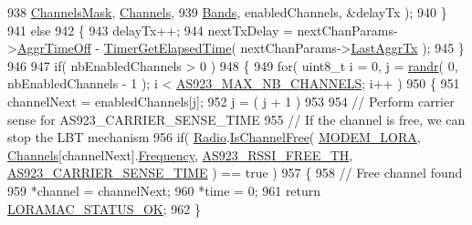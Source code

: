 \begin{DoxyCode}
938                                                       \mbox{\hyperlink{_region_a_s923_8c_a2188957b5ca6af8092154d7ccbfa5757}{ChannelsMask}}, 
      \mbox{\hyperlink{_region_a_s923_8c_a02bae2504563543865d6b0e81c48ab61}{Channels}},
939                                                       \mbox{\hyperlink{_region_a_s923_8c_a0b72a92a2d2766ee7cbc3ae162996cbf}{Bands}}, enabledChannels, &delayTx );
940     \}
941     \textcolor{keywordflow}{else}
942     \{
943         delayTx++;
944         nextTxDelay = nextChanParams->\mbox{\hyperlink{structs_next_chan_params_a3609676d2d3b7c00e25615324b35cb26}{AggrTimeOff}} - 
      \mbox{\hyperlink{time_server_8c_a9ca7e27f3d6474daff63f2e093a2e91e}{TimerGetElapsedTime}}( nextChanParams->\mbox{\hyperlink{structs_next_chan_params_a381b728f60b185ecf3313e974c18768b}{LastAggrTx}} );
945     \}
946 
947     \textcolor{keywordflow}{if}( nbEnabledChannels > 0 )
948     \{
949         \textcolor{keywordflow}{for}( uint8\_t  i = 0, j = \mbox{\hyperlink{utilities_8c_af5d8ad6dae489ac64821e7d4f004595d}{randr}}( 0, nbEnabledChannels - 1 ); i < 
      \mbox{\hyperlink{group___r_e_g_i_o_n_a_s923_ga02e3db7e4557dbf77db79285d38dc33e}{AS923\_MAX\_NB\_CHANNELS}}; i++ )
950         \{
951             channelNext = enabledChannels[j];
952             j = ( j + 1 ) %
953 
954             \textcolor{comment}{// Perform carrier sense for AS923\_CARRIER\_SENSE\_TIME}
955             \textcolor{comment}{// If the channel is free, we can stop the LBT mechanism}
956             \textcolor{keywordflow}{if}( \mbox{\hyperlink{sx1276mb1las_8c_acf9fe61a72c16fa29a0dc449d23e3820}{Radio}}.\mbox{\hyperlink{struct_radio__s_a4c8c593c3c380636ec2ca7c452d59281}{IsChannelFree}}( \mbox{\hyperlink{radio_8h_a992ef7a5b7f52975ba7bd8dd97740057abeb331e097974ea65b07d74df9e85a8e}{MODEM\_LORA}}, 
      \mbox{\hyperlink{_region_a_s923_8c_a02bae2504563543865d6b0e81c48ab61}{Channels}}[channelNext].\mbox{\hyperlink{structs_channel_params_ade3d190636488dad9a89b19446b7acf1}{Frequency}}, \mbox{\hyperlink{group___r_e_g_i_o_n_a_s923_gabcc79c4eb4e2717692ac348885e3139f}{AS923\_RSSI\_FREE\_TH}}, 
      \mbox{\hyperlink{group___r_e_g_i_o_n_a_s923_ga6c93e3596e26eb72247906ee33523404}{AS923\_CARRIER\_SENSE\_TIME}} ) == true )
957             \{
958                 \textcolor{comment}{// Free channel found}
959                 *channel = channelNext;
960                 *time = 0;
961                 \textcolor{keywordflow}{return} \mbox{\hyperlink{group___l_o_r_a_m_a_c_gga1d18f26b344040b3ec5c3db662919661a03db5fca052313edb3823c014b653a74}{LORAMAC\_STATUS\_OK}};
962             \}

\end{DoxyCode}
